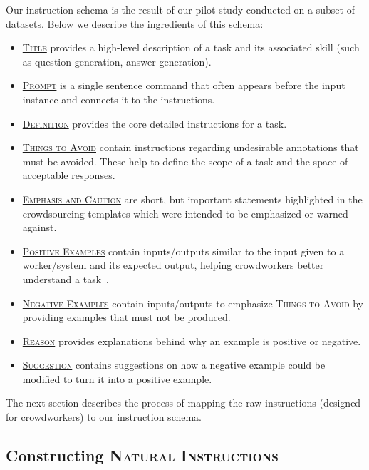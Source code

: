 Our instruction schema is the result of our pilot study conducted on a subset of  datasets. Below we describe the ingredients of this schema:

\begin{itemize}[noitemsep,topsep=0pt,parsep=3pt,leftmargin=0.3cm]

    \item \underline{\textsc{Title}} provides a high-level description of a task and its associated skill (such as question generation, answer generation).
    \item  \underline{\textsc{Prompt}} is a single sentence command that often appears before the input instance and connects it to the instructions.
    \item \underline{\textsc{Definition}} provides the core detailed instructions for a task. 

    \item \underline{\textsc{Things to Avoid}} contain instructions regarding undesirable annotations that must be avoided. These help to define the scope of a task and the space of acceptable responses. 

    \item \underline{\textsc{Emphasis and Caution}} are short, but important statements highlighted in the crowdsourcing templates which were intended to be  emphasized or warned against. 
    \item \underline{\textsc{Positive Examples}} contain inputs/outputs similar to the input given to a worker/system and its expected output,  helping crowdworkers better understand a task~\cite{ali1981use}. 
    \item \underline{\textsc{Negative Examples}} contain inputs/outputs to emphasize \textsc{Things to Avoid} by providing examples that must not be produced. 

    \item \underline{\textsc{Reason}}  provides explanations behind why an example is positive or negative.
    \item \underline{\textsc{Suggestion}} contains suggestions on how a negative example could be modified to turn it into a positive example. 
\end{itemize}

    The next section describes the process of mapping the raw instructions (designed for crowdworkers) to our instruction schema. 

\subsection{Constructing \textsc{Natural Instructions}} 
\label{sec:mapping}

